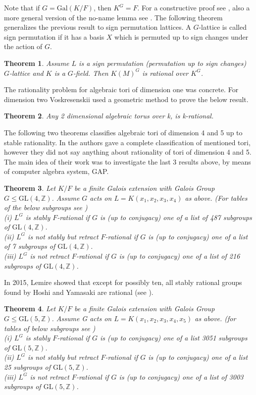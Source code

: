 \documentclass[12pt]{article}
\theoremstyle{plain}
\newtheorem{theorem}{Theorem}
\theoremstyle{definition}
\newcommand{\Z}{\ensuremath{\mathbb{Z}}}
\newcommand{\G}{G}
\begin{document}
Note that if $\G = \mathrm{Gal} (K/F)$, then $K^\G = F$. For a constructive proof see 
\cite{JamLemSch2019}, also a more general version of the no-name lemma see \cite{Domokos}. The following 
theorem generalizes the previous result to sign permutation lattices. A $G$-lattice is called 
sign permutation if it has a basis $X$ which is permuted up to sign changes under the action of $G$.
\begin{theorem}\cite[Proposition 9.5.1]{Lorenz}\label{thm:signpermrat}
Assume $L$ is a sign permutation (permutation up to sign changes) $G$-lattice and $K$ is a $G$-field. Then $K(M)^G$ 
is rational over $K^G$.
\end{theorem}
The rationality problem for algebraic tori of dimension one was concrete. For 
dimension two Voskresenskii used a geometric method to prove the below result. 
\begin{theorem}
\cite{Vos67} Any 2 dimensional algebraic torus over k, is k-rational.
\end{theorem} 
The following two theorems classifies algebraic tori of dimension 4 and  5 up to stable 
rationality. In \cite{Hoshi} the authors gave a complete classification of mentioned tori, 
however they did not say anything about rationality of tori of dimension 4 and 5. The 
main idea of their work was to investigate the last 3 results above, by means of computer 
algebra system, GAP. 
\begin{theorem}\cite[Theorem 1.9]{Hoshi}
Let $K/F$ be a finite Galois extension with Galois Group $\G \leqslant \mathrm{GL}(4, \Z)$. 
Assume $G$ acts on $L = K(x_1,x_2,x_3,x_4)$ as above. (For tables of the below subgroups 
see \cite[Page 4]{Hoshi})
\\ 
(i) $L^\G$ is stably $F$-rational if $G$ is (up to conjugacy) one of a list of 487 
subgroups of $\mathrm{GL}(4,\Z)$.
\\ 
(ii)  $L^\G$ is not stably but retract $F$-rational if $G$ is (up to conjugacy) one 
of a list of 7 subgroups of $\mathrm{GL}(4,\Z)$.
\\
(iii) $L^\G$ is not retract $F$-rational if $G$ is (up to conjugacy) one of a list of 
216 subgroups of $\mathrm{GL}(4,\Z)$.
 \end{theorem}
In 2015, Lemire showed that except for possibly ten, all stably rational groups found 
by Hoshi and Yamasaki are rational (see \cite{Nicole1}).
\begin{theorem}\label{thm:Hoshi}\cite[Theorem 1.12]{Hoshi}
Let $K/F$ be a finite Galois extension with Galois Group $\G  \leqslant \mathrm{GL}(5, \Z)$. 
Assume G acts on $L = K(x_1,x_2,x_3,x_4,x_5)$ as above. (for tables of below subgroups see 
\cite[Pages 134-144]{Hoshi})
\\ 
(i) $L^\G$ is stably $F$-rational if $G$ is (up to conjugacy) one of a list 3051 subgroups 
of $\mathrm{GL}(5,\Z)$.
\\ 
(ii)  $L^\G$ is not stably but retract $F$-rational if $G$ is (up to conjugacy) one of a list 
25 subgroups of $\mathrm{GL}(5,\Z)$.
\\
(iii) $L^\G$ is not retract $F$-rational if $G$ is (up to conjugacy) one of a list of 3003 
subgroups of $\mathrm{GL}(5,\Z)$.
 \end{theorem}
\end{document}
